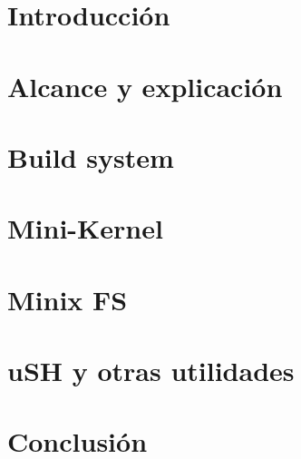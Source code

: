 \section{Introducción}


\newpage
\section{Alcance y explicación}


\newpage
\section{Build system}


\newpage
\section{Mini-Kernel}


\newpage
\section{Minix FS}


\newpage
\section{uSH y otras utilidades}


\newpage
\section{Conclusión}

